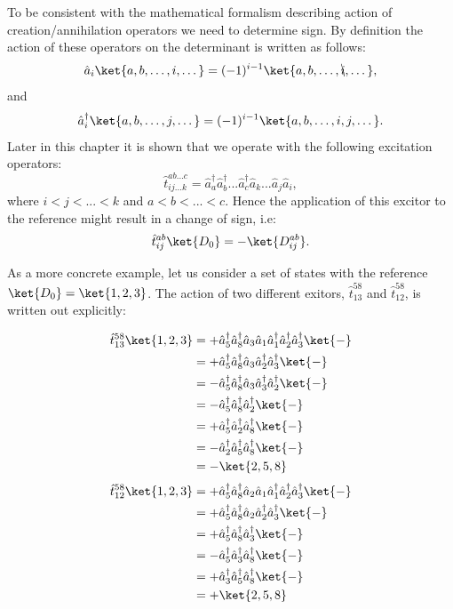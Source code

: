 \documentclass[twoside,english]{uiofysmaster}
\begin{document}
To be consistent with the mathematical formalism describing action of creation/annihilation operators we need to determine sign. By definition the action of these operators on the determinant is written as follows:
\[
\hat{a}_i \ket{a,b,\dots, i,\dots} = (-1)^{i-1} \ket{a,b,\dots, \bcancel{i},\dots},
\]
and
\[
\hat{a}^\dagger_i \ket{a,b,\dots, j, \dots} = (-1)^{i-1} \ket{a,b,\dots, i,j,\dots}.
\]
Later in this chapter it is shown that we operate with the following excitation operators:
\[
\hat{t}_{ij...k}^{ab...c} = \hat{a}^\dagger_a \hat{a}^\dagger_b ... \hat{a}^\dagger_c \hat{a}_k ... \hat{a}_j \hat{a}_i,
\]
where $i<j<...<k$ and $a<b<...<c$.
Hence the application of this excitor to the reference might result in a change of sign, i.e:
\[
\hat{t}_{ij}^{ab} \ket{D_0} = -\ket{D_{ij}^{ab}}.
\]

As a more concrete example, let us consider a set of states with the reference $\ket{D_0} = \ket{1,2,3}$. The action of two different exitors, $ \hat{t}_{13}^{58}$ and $\hat{t}_{12}^{58}$, is written out explicitly:

\begin{align*}
   \hat{t}_{13}^{58} \ket{1,2,3} &= + \hat{a}^\dagger_5 \hat{a}^\dagger_8 \hat{a}_3 \hat{a}_1 \hat{a}^\dagger_1 \hat{a}^\dagger_2 \hat{a}^\dagger_3 \ket{-}\\
                         &= + \hat{a}^\dagger_5 \hat{a}^\dagger_8 \hat{a}_3 \hat{a}^\dagger_2 \hat{a}^\dagger_3 \ket{-}\\
                         &= - \hat{a}^\dagger_5 \hat{a}^\dagger_8 \hat{a}_3 \hat{a}^\dagger_3 \hat{a}^\dagger_2 \ket{-}\\
                         &= - \hat{a}^\dagger_5 \hat{a}^\dagger_8 \hat{a}^\dagger_2 \ket{-}\\
                         &= + \hat{a}^\dagger_5 \hat{a}^\dagger_2 \hat{a}^\dagger_8 \ket{-}\\
                         &= - \hat{a}^\dagger_2 \hat{a}^\dagger_5 \hat{a}^\dagger_8 \ket{-}\\
                         &= - \ket{2,5,8}\\
\end{align*}
\begin{align*}
           \hat{t}_{12}^{58} \ket{1,2,3} &= + \hat{a}^\dagger_5 \hat{a}^\dagger_8 \hat{a}_2 \hat{a}_1 \hat{a}^\dagger_1 \hat{a}^\dagger_2 \hat{a}^\dagger_3 \ket{-}\\
                                 &= + \hat{a}^\dagger_5 \hat{a}^\dagger_8 \hat{a}_2 \hat{a}^\dagger_2 \hat{a}^\dagger_3 \ket{-}\\
                                 &= + \hat{a}^\dagger_5 \hat{a}^\dagger_8 \hat{a}^\dagger_3 \ket{-}\\
                                 &= - \hat{a}^\dagger_5 \hat{a}^\dagger_3 \hat{a}^\dagger_8 \ket{-}\\
                                 &= + \hat{a}^\dagger_3 \hat{a}^\dagger_5 \hat{a}^\dagger_8 \ket{-}\\
                                 &= + \ket{2,5,8}
\end{align*}
\end{document}
